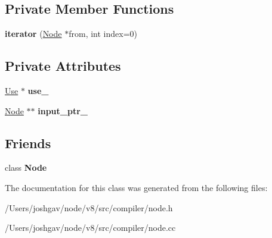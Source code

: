 \subsection*{Private Member Functions}
\begin{DoxyCompactItemize}
\item 
{\bfseries iterator} (\hyperlink{classv8_1_1internal_1_1compiler_1_1_node}{Node} $\ast$from, int index=0)\hypertarget{classv8_1_1internal_1_1compiler_1_1_node_1_1_input_edges_1_1iterator_ae1e3d668ce51494f60e60936453e1e3e}{}\label{classv8_1_1internal_1_1compiler_1_1_node_1_1_input_edges_1_1iterator_ae1e3d668ce51494f60e60936453e1e3e}

\end{DoxyCompactItemize}
\subsection*{Private Attributes}
\begin{DoxyCompactItemize}
\item 
\hyperlink{structv8_1_1internal_1_1compiler_1_1_node_1_1_use}{Use} $\ast$ {\bfseries use\+\_\+}\hypertarget{classv8_1_1internal_1_1compiler_1_1_node_1_1_input_edges_1_1iterator_a7a004618f1cce17534b352655552ac2a}{}\label{classv8_1_1internal_1_1compiler_1_1_node_1_1_input_edges_1_1iterator_a7a004618f1cce17534b352655552ac2a}

\item 
\hyperlink{classv8_1_1internal_1_1compiler_1_1_node}{Node} $\ast$$\ast$ {\bfseries input\+\_\+ptr\+\_\+}\hypertarget{classv8_1_1internal_1_1compiler_1_1_node_1_1_input_edges_1_1iterator_a7bb79098973c411325dcd7bb4e724358}{}\label{classv8_1_1internal_1_1compiler_1_1_node_1_1_input_edges_1_1iterator_a7bb79098973c411325dcd7bb4e724358}

\end{DoxyCompactItemize}
\subsection*{Friends}
\begin{DoxyCompactItemize}
\item 
class {\bfseries Node}\hypertarget{classv8_1_1internal_1_1compiler_1_1_node_1_1_input_edges_1_1iterator_a6db9d28bd448a131448276ee03de1e6d}{}\label{classv8_1_1internal_1_1compiler_1_1_node_1_1_input_edges_1_1iterator_a6db9d28bd448a131448276ee03de1e6d}

\end{DoxyCompactItemize}


The documentation for this class was generated from the following files\+:\begin{DoxyCompactItemize}
\item 
/\+Users/joshgav/node/v8/src/compiler/node.\+h\item 
/\+Users/joshgav/node/v8/src/compiler/node.\+cc\end{DoxyCompactItemize}
